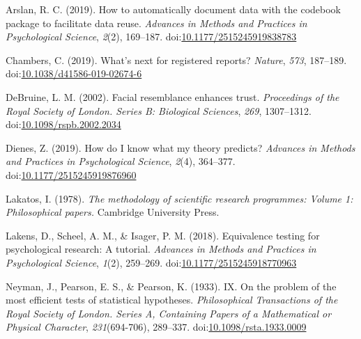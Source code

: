 \documentclass[doc,floatsintext]{apa6}
\begin{document}
\begingroup
\setlength{\parindent}{-0.5in}
\setlength{\leftskip}{0.5in}

\hypertarget{refs}{}
\leavevmode\hypertarget{ref-arslan2019}{}%
Arslan, R. C. (2019). How to automatically document data with the codebook package to facilitate data reuse. \emph{Advances in Methods and Practices in Psychological Science}, \emph{2}(2), 169--187. doi:\href{https://doi.org/10.1177/2515245919838783}{10.1177/2515245919838783}

\leavevmode\hypertarget{ref-chambers2019}{}%
Chambers, C. (2019). What's next for registered reports? \emph{Nature}, \emph{573}, 187--189. doi:\href{https://doi.org/10.1038/d41586-019-02674-6}{10.1038/d41586-019-02674-6}

\leavevmode\hypertarget{ref-debruine2002}{}%
DeBruine, L. M. (2002). Facial resemblance enhances trust. \emph{Proceedings of the Royal Society of London. Series B: Biological Sciences}, \emph{269}, 1307--1312. doi:\href{https://doi.org/10.1098/rspb.2002.2034}{10.1098/rspb.2002.2034}

\leavevmode\hypertarget{ref-dienes2019}{}%
Dienes, Z. (2019). How do I know what my theory predicts? \emph{Advances in Methods and Practices in Psychological Science}, \emph{2}(4), 364--377. doi:\href{https://doi.org/10.1177/2515245919876960}{10.1177/2515245919876960}

\leavevmode\hypertarget{ref-lakatos1978}{}%
Lakatos, I. (1978). \emph{The methodology of scientific research programmes: Volume 1: Philosophical papers.} Cambridge University Press.

\leavevmode\hypertarget{ref-lakens2018}{}%
Lakens, D., Scheel, A. M., \& Isager, P. M. (2018). Equivalence testing for psychological research: A tutorial. \emph{Advances in Methods and Practices in Psychological Science}, \emph{1}(2), 259--269. doi:\href{https://doi.org/10.1177/2515245918770963}{10.1177/2515245918770963}

\leavevmode\hypertarget{ref-neyman1933}{}%
Neyman, J., Pearson, E. S., \& Pearson, K. (1933). IX. On the problem of the most efficient tests of statistical hypotheses. \emph{Philosophical Transactions of the Royal Society of London. Series A, Containing Papers of a Mathematical or Physical Character}, \emph{231}(694-706), 289--337. doi:\href{https://doi.org/10.1098/rsta.1933.0009}{10.1098/rsta.1933.0009}

\endgroup
\end{document}
